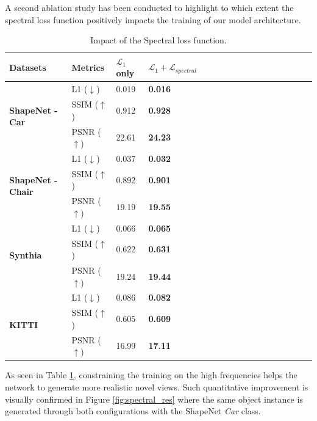 A second ablation study has been conducted to highlight to which extent the spectral loss function positively impacts the training of our model architecture. 
\begin{table}[h!]
\begin{center}
\begin{tabular}{@{}lllllllllllllllll@{}}
  \toprule
  Datasets & Metrics  &$\mathcal{L}_{1}$ only  &  $\mathcal{L}_{1}+\mathcal{L}_{spectral}$ &   \\
  \midrule
  \multirow{3}{*}{\textbf{ShapeNet - Car}} & L1 ($\downarrow$) &\hfil 0.019 & \hfil\textbf{0.016} \\
  & SSIM ($\uparrow$) & \hfil0.912 & \hfil\textbf{0.928}\\
  & PSNR ($\uparrow$)& \hfil22.61 & \hfil\textbf{24.23}\\
  \midrule
  \multirow{3}{*}{\textbf{ShapeNet - Chair}} & L1 ($\downarrow$) & \hfil 0.037 & \hfil \textbf{0.032}\\
  & SSIM ($\uparrow$)&\hfil 0.892 & \hfil \textbf{0.901} \\
  & PSNR ($\uparrow$) & \hfil 19.19 & \hfil \textbf{19.55} \\
  \midrule
  \multirow{3}{*}{\textbf{Synthia}} & L1 ($\downarrow$)& \hfil 0.066 & \hfil \textbf{0.065}\\
  & SSIM ($\uparrow$)& \hfil 0.622 & \hfil \textbf{0.631} \\
  & PSNR ($\uparrow$)& \hfil 19.24 & \hfil \textbf{19.44}\\
  \midrule
  \multirow{3}{*}{\textbf{KITTI}} & L1 ($\downarrow$)& \hfil 0.086 & \hfil \textbf{0.082}\\
  & SSIM ($\uparrow$)& \hfil 0.605 & \hfil \textbf{0.609} \\
  & PSNR ($\uparrow$)& \hfil 16.99 & \hfil \textbf{17.11}\\\hline
\hline
\end{tabular}
\end{center}
\caption{Impact of the Spectral loss function.}
\label{tab:spectral}
\end{table}

As seen in Table \ref{tab:spectral}, constraining the training on the high frequencies helps the network to generate more realistic novel views. Such quantitative improvement is visually confirmed in Figure \ref{fig:spectral_res} where the same object instance is generated through both configurations with the ShapeNet \textit{Car} class.\newline 

